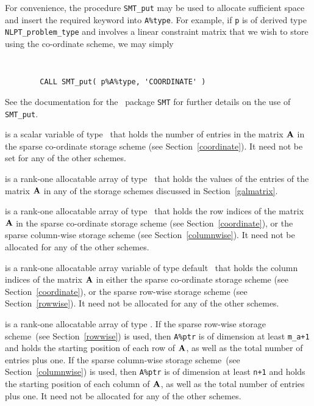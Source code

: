 \documentclass{galahad}
\begin{document}
\begin{description}
\begin{description}
For convenience, the procedure {\tt SMT\_put} 
may be used to allocate sufficient space and insert the required keyword
into {\tt A\%type}.
For example, if {\tt p} is of derived type {\tt NLPT\_problem\_type}
and involves a linear constraint matrix that we wish to store using the co-ordinate scheme,
we may simply
{\tt 
\begin{verbatim}
        CALL SMT_put( p%A%type, 'COORDINATE' )
\end{verbatim}
}
\noindent
See the documentation for the \galahad\ package {\tt SMT} 
for further details on the use of {\tt SMT\_put}.

 is a scalar variable of type \integer\ that holds
the number of entries in the matrix ${\mathbf{A}}$ in the sparse co-ordinate
storage scheme (see Section~\ref{coordinate}).  It need not be set for
any of the other schemes.

 is a rank-one allocatable array of type \realdp\ that holds
the values of the entries of the matrix ${\mathbf{A}}$ in any of the 
storage schemes discussed in Section~\ref{galmatrix}.

 is a rank-one allocatable array of type \integer\
that holds the row indices of the matrix ${\mathbf{A}}$ in the sparse
co-ordinate storage scheme (see Section~\ref{coordinate}), or the
sparse column-wise storage scheme (see Section~\ref{columnwise}).  It
need not be allocated for any of the other schemes.

 is a rank-one allocatable array variable of type default
\integer\ that holds the column indices of the matrix ${\mathbf{A}}$ in
either the sparse co-ordinate storage scheme (see Section~\ref{coordinate}), or the
sparse row-wise storage scheme (see Section~\ref{rowwise}).  It need
not be allocated for any of the other schemes.

 is a rank-one allocatable array of type \integer.
If the sparse row-wise storage scheme~(see Section~\ref{rowwise}) is used,
then {\tt A\%ptr} is of dimension at least {\tt m\_a+1} and holds the
starting position of each row of ${\mathbf{A}}$, as well as the total number
of entries plus one.  If the sparse column-wise storage scheme~(see
Section~\ref{columnwise}) is used, then {\tt A\%ptr} is of dimension
at least {\tt n+1} and holds the starting position of each column of ${\mathbf{A}}$, as well as
the total number of entries plus one.  It need not be allocated for
any of the other schemes.


\end{description}
\end{description}
\end{document}
